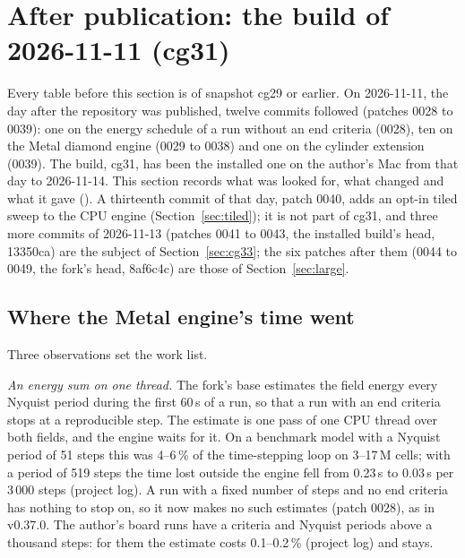 \section{After publication: the build of 2026-11-11 (cg31)}\label{sec:cg31}

Every table before this section is of snapshot cg29 or earlier. On 2026-11-11, the day after the repository was
published, twelve commits followed (patches 0028 to 0039): one on the energy schedule of a run without an end criteria
(0028), ten on the Metal diamond engine (0029 to 0038) and one on the cylinder extension (0039). The build, cg31, has
been the installed one on the author's Mac from that day to 2026-11-14. This section records what was looked for, what changed and
what it gave (). A thirteenth commit of that day, patch 0040, adds
an opt-in tiled sweep to the CPU engine (Section~\ref{sec:tiled}); it is not part of cg31, and
three more commits of 2026-11-13 (patches 0041 to 0043, the installed build's head, 13350ca) are the subject of
Section~\ref{sec:cg33}; the six patches after them (0044 to 0049, the fork's head, 8af6c4c) are those of Section~\ref{sec:large}.

\subsection{Where the Metal engine's time went}
Three observations set the work list.

\emph{An energy sum on one thread.} The fork's base estimates the field energy every Nyquist period during the first
60\,s of a run, so that a run with an end criteria stops at a reproducible step. The estimate is one pass of one CPU
thread over both fields, and the engine waits for it. On a benchmark model with a Nyquist period of 51 steps this was
4--6\,\% of the time-stepping loop on 3--17\,M cells; with a period of 519 steps the time lost outside the engine fell
from 0.23\,s to 0.03\,s per 3\,000 steps (project log). A run with a fixed number of steps and no end criteria has
nothing to stop on, so it now makes no such estimates (patch 0028), as in v0.37.0. The author's board runs have a
criteria and Nyquist periods above a thousand steps: for them the estimate costs 0.1--0.2\,\% (project log) and stays.

